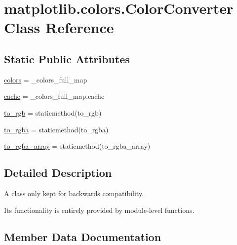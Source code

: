\hypertarget{classmatplotlib_1_1colors_1_1ColorConverter}{}\section{matplotlib.\+colors.\+Color\+Converter Class Reference}
\label{classmatplotlib_1_1colors_1_1ColorConverter}
\subsection*{Static Public Attributes}
\begin{DoxyCompactItemize}
\item 
\hyperlink{classmatplotlib_1_1colors_1_1ColorConverter_a4e67d264dee619273c8588a1fe9721de}{colors} = \+\_\+colors\+\_\+full\+\_\+map
\item 
\hyperlink{classmatplotlib_1_1colors_1_1ColorConverter_a3fc0e6a5318fa9de8b07aa1ec76cbaa7}{cache} = \+\_\+colors\+\_\+full\+\_\+map.\+cache
\item 
\hyperlink{classmatplotlib_1_1colors_1_1ColorConverter_aef00f99dbf860999a328442a288312a5}{to\+\_\+rgb} = staticmethod(to\+\_\+rgb)
\item 
\hyperlink{classmatplotlib_1_1colors_1_1ColorConverter_a7bd63b83157393b8c473c7c48b7af84a}{to\+\_\+rgba} = staticmethod(to\+\_\+rgba)
\item 
\hyperlink{classmatplotlib_1_1colors_1_1ColorConverter_a011ab7a168439f586e4961a360fd91e3}{to\+\_\+rgba\+\_\+array} = staticmethod(to\+\_\+rgba\+\_\+array)
\end{DoxyCompactItemize}


\subsection{Detailed Description}
\begin{DoxyVerb}A class only kept for backwards compatibility.

Its functionality is entirely provided by module-level functions.
\end{DoxyVerb}
 

\subsection{Member Data Documentation}
\mbox{\label{classmatplotlib_1_1colors_1_1ColorConverter_a3fc0e6a5318fa9de8b07aa1ec76cbaa7}} 

